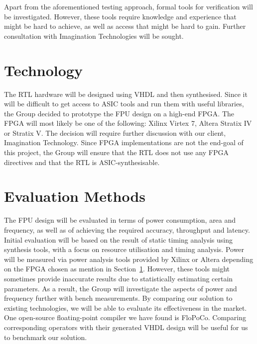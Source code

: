\documentclass[11pt]{report}
\begin{document}
Apart from the aforementioned testing approach, formal tools for verification will be investigated. However, these tools require knowledge and experience that might be hard to achieve, as well as access that might be hard to gain. Further consultation with Imagination Technologies will be sought.

\section{Technology}\label{sec:tech}
The RTL hardware will be designed using VHDL and then synthesised. Since it will be difficult to get access to ASIC tools and run them with useful libraries, the Group decided to prototype the FPU design on a high-end FPGA. The FPGA will most likely be one of the following: Xilinx Virtex 7, Altera Stratix IV or Stratix V. The decision will require further discussion with our client, Imagination Technology. Since FPGA implementations are not the end-goal of this project, the Group will ensure that the RTL does not use any FPGA directives %
and that the RTL is ASIC-synthesisable. 



\section{Evaluation Methods}
The FPU design will be evaluated in terms of power consumption, area and frequency, as well as of achieving the required accuracy, throughput and latency. Initial evaluation will be based on the result of static timing analysis using synthesis tools, with a focus on resource utilisation and timing analysis. Power will be measured via power analysis tools provided by Xilinx or Altera depending on the FPGA chosen as mention in Section~\ref{sec:tech}. However, these tools might sometimes provide inaccurate results due to statistically estimating certain parameters. As a result, the Group will investigate the aspects of power and frequency further with bench measurements. 
By comparing our solution to existing technologies, we will be able to evaluate its effectiveness in the market. One open-source floating-point compiler we have found is FloPoCo. Comparing corresponding operators with their generated VHDL design will be useful for us to benchmark our solution.
\end{document}
